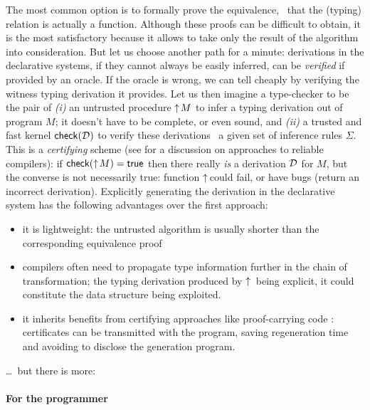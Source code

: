 \documentclass[9pt]{sigplanconf}
\begin{document}
The most common option is to formally prove the equivalence, \ie\ that
the (typing) relation is actually a function. Although these proofs
can be difficult to obtain, it is the most satisfactory because it
allows to take only the result of the algorithm into
consideration. But let us choose another path for a minute:
derivations in the declarative systems, if they cannot always be
easily inferred, can be \emph{verified} if provided by an oracle. If
the oracle is wrong, we can tell cheaply by verifying the witness
typing derivation it provides. Let us then imagine a type-checker to
be the pair of \emph{(i)} an untrusted procedure $\uparrow\!{M}$ to infer
a typing derivation out of program $M$; it doesn't have to be
complete, or even sound, and \emph{(ii)} a trusted and fast kernel
${\text{\textsf{check}}}({\mathcal D})$ to verify these derivations \wrt\ a given set of inference
rules $\Sigma$. This is a \emph{certifying} scheme (see
\cite{leroy2006compcert} for a discussion on approaches to reliable
compilers): if ${\text{\textsf{check}}}({\uparrow\!{M}}) = \text{\textsf{true}}$ then there really
\emph{is} a derivation $\mathcal D$ for $M$, but the converse is not
necessarily true: function $\uparrow\!{}\!\!$ could fail, or have bugs
(return an incorrect derivation). Explicitly generating the derivation
in the declarative system has the following advantages over the first
approach:
\begin{itemize}
\item it is lightweight: the untrusted algorithm is usually shorter
  than the corresponding equivalence proof
\item compilers often need to propagate type information further in
  the chain of transformation; the typing derivation produced by
  $\uparrow\!{}$ being explicit, it could constitute the data structure
  being exploited.
\item it inherits benefits from certifying approaches like
  proof-carrying code \cite{necula1997proof}: certificates can be
  transmitted with the program, saving regeneration time and avoiding
  to disclose the generation program.
\end{itemize}
\ldots\ but there is more:

\paragraph{For the programmer}
\end{document}
